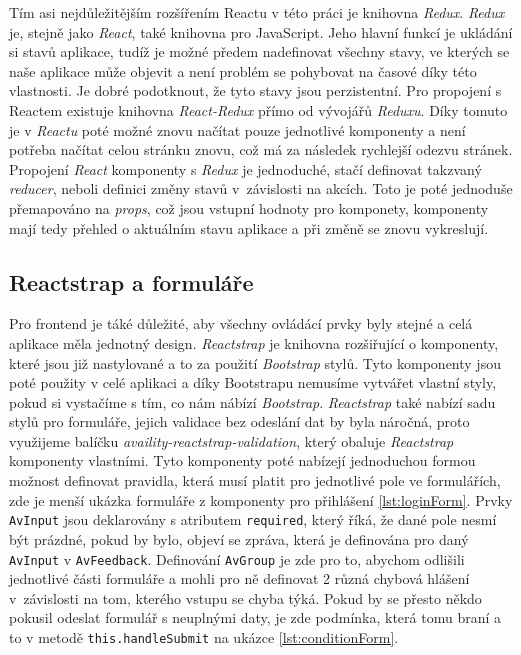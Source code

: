 Tím asi nejdůležitějším rozšířením Reactu v této práci je knihovna \textit{Redux}. \textit{Redux} je, stejně jako \textit{React}, také knihovna pro JavaScript. Jeho hlavní funkcí je
ukládání si stavů aplikace, tudíž je možné předem nadefinovat všechny stavy, ve kterých se naše aplikace může objevit a není problém se pohybovat na časové
díky této vlastnosti. Je dobré podotknout, že tyto stavy jsou perzistentní. Pro propojení s Reactem existuje knihovna \textit{React-Redux} přímo od vývojářů \textit{Reduxu}. \cite{redux}
Díky tomuto je v \textit{Reactu} poté možné znovu načítat pouze jednotlivé komponenty a není potřeba načítat celou stránku znovu, což má za následek rychlejší odezvu stránek.
Propojení \textit{React} komponenty s \textit{Redux} je jednoduché, stačí definovat takzvaný \textit{reducer}, neboli definici změny stavů v~závislosti na akcích. Toto je
poté jednoduše přemapováno na \textit{props}, což jsou vstupní hodnoty pro komponety, komponenty mají tedy přehled o aktuálním stavu aplikace a při změně se znovu vykreslují.

\subsection{Reactstrap a formuláře}

Pro frontend je táké důležité, aby všechny ovládácí prvky byly stejné a celá aplikace měla jednotný design. \textit{Reactstrap} je knihovna rozšiřující  o komponenty,
které jsou již nastylované a to za použití \textit{Bootstrap} stylů. Tyto komponenty jsou poté použity v celé aplikaci a díky Bootstrapu nemusíme vytvářet vlastní styly,
pokud si vystačíme s tím, co nám nábízí \textit{Bootstrap}. \textit{Reactstrap} také nabízí sadu stylů pro formuláře, jejich validace bez odeslání dat by byla náročná, proto
využijeme balíčku \textit{availity-reactstrap-validation}, který obaluje \textit{Reactstrap} komponenty vlastními. Tyto komponenty poté nabízejí jednoduchou formou možnost
definovat pravidla, která musí platit pro jednotlivé pole ve formulářích, zde je menší ukázka formuláře z komponenty pro přihlášení \ref{lst:loginForm}. Prvky \texttt{AvInput}
jsou deklarovány s atributem \texttt{required}, který říká, že dané pole nesmí být prázdné, pokud by bylo, objeví se zpráva, která je definována pro daný \texttt{AvInput} v
\texttt{AvFeedback}. Definování \texttt{AvGroup} je zde pro to, abychom odlišili jednotlivé části formuláře a mohli pro ně definovat 2 různá chybová hlášení v~závislosti na
tom, kterého vstupu se chyba týká. Pokud by se přesto někdo pokusil odeslat formulář s neuplnými daty, je zde podmínka, která tomu braní a to v metodě \texttt{this.handleSubmit}
na ukázce \ref{lst:conditionForm}.


